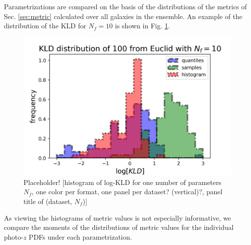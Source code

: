 \documentclass[\docopts]{\docclass}
\newcommand{\pz}{photo-$z$ PDF}
\begin{document}
Parametrizations are compared on the basis of the distributions of the metrics 
of Sec. \ref{sec:metric} calculated over all galaxies in the ensemble.  An 
example of the distribution of the KLD for $N_{f}=10$ is shown in Fig. 
\ref{fig:individual}.

\begin{figure}
  \includegraphics[width=0.9\columnwidth]{figures/individual_placeholder.png}
  \caption{Placeholder! [histogram of log-KLD for one number of parameters 
$N_{f}$, one color per format, one panel per dataset? (vertical)?, panel title 
of (dataset, $N_{f}$)]  
  \label{fig:individual}}
\end{figure}

As viewing the histograms of metric values is not especially informative, we 
compare the moments of the distributions of metric values for the individual 
\pz s under each parametrization.
\end{document}
